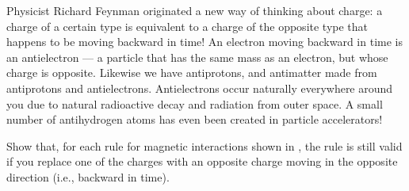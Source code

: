 Physicist Richard Feynman originated a new way of thinking about charge: a charge of a certain
type is equivalent to a charge of the opposite type that happens to be moving backward
in time! An electron moving backward in time is an antielectron --- a particle that has the same
mass as an electron, but whose charge is opposite. Likewise we have antiprotons, and antimatter
made from antiprotons and antielectrons. Antielectrons occur naturally everywhere around you due to
natural radioactive decay and radiation from outer space. A small number of antihydrogen atoms has even
been created in particle accelerators!

Show that, for each rule for magnetic interactions shown in , the rule is
still valid if you replace one of the charges with an opposite charge moving in the 
opposite direction (i.e., backward in time).
